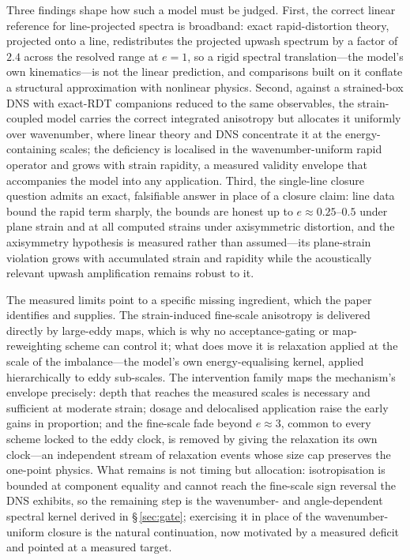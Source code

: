 \documentclass[11pt,a4paper]{article}
\begin{document}
Three findings shape how such a model must be judged. First, the
correct linear reference for line-projected spectra is broadband: exact
rapid-distortion theory, projected onto a line, redistributes the
projected upwash spectrum by a factor of $2.4$ across the resolved range
at $e=1$, so a rigid spectral translation---the model's own
kinematics---is not the linear prediction, and comparisons built on it
conflate a structural approximation with nonlinear physics. Second,
against a strained-box DNS with exact-RDT companions reduced to the
same observables, the strain-coupled model carries the correct
integrated anisotropy but allocates it uniformly over wavenumber, where
linear theory and DNS concentrate it at the energy-containing scales;
the deficiency is localised in the wavenumber-uniform rapid operator
and grows with strain rapidity, a measured validity envelope that
accompanies the model into any application. Third, the single-line
closure question admits an exact, falsifiable answer in place of a
closure claim: line data bound the rapid term sharply, the bounds are
honest up to $e\approx0.25$--$0.5$ under plane strain and at all
computed strains under axisymmetric distortion, and the axisymmetry
hypothesis is measured rather than assumed---its plane-strain violation
grows with accumulated strain and rapidity while the acoustically
relevant upwash amplification remains robust to it.

The measured limits point to a specific missing ingredient, which the
paper identifies and supplies. The strain-induced fine-scale
anisotropy is delivered directly by large-eddy maps, which is why no
acceptance-gating or map-reweighting scheme can control it; what does
move it is relaxation applied at the scale of the imbalance---the
model's own energy-equalising kernel, applied hierarchically to eddy
sub-scales. The intervention family maps the mechanism's envelope
precisely: depth that reaches the measured scales is necessary and
sufficient at moderate strain; dosage and delocalised application
raise the early gains in proportion; and the fine-scale fade beyond
$e\approx3$, common to every scheme locked to the eddy clock, is
removed by giving the relaxation its own clock---an independent stream
of relaxation events whose size cap preserves the one-point
physics. What remains is not timing but allocation: isotropisation is
bounded at component equality and cannot reach the fine-scale sign
reversal the DNS exhibits, so the remaining step is the
wavenumber- and angle-dependent spectral kernel derived in
\S\,\ref{sec:gate}; exercising it in place of the wavenumber-uniform
closure is the natural continuation, now motivated by a measured
deficit and pointed at a measured target.
\end{document}
